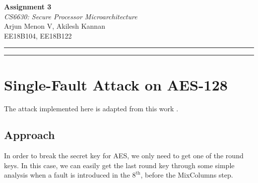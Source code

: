 \documentclass[12pt,a4paper,english]{paper}
\def \courseNumber {CS6630}
\def \courseName {Secure Processor Microarchitecture}
\def \assignmentName {Assignment 3}
\def \myName {Arjun Menon V, Akilesh Kannan}
\def \rollNumber {EE18B104, EE18B122}
\newenvironment{warning}{%
  \def\FrameCommand{%
    \hspace{1pt}%
    {\color{red}\vrule width 2pt}%
    {\color{formalred}\vrule width 4pt}%
    \colorbox{formalred}%
  }%
  \MakeFramed{\advance\hsize-\width\FrameRestore}%
  \noindent\hspace{-4.55pt}%
  \begin{adjustwidth}{7pt}{}%
  \vspace{2pt}\vspace{2pt}%
}
{%
  \vspace{2pt}\end{adjustwidth}\endMakeFramed%
}
\begin{document}
\thispagestyle{empty}
\vspace{-4.5cm}

\hspace*{-\parindent}
\begin{minipage}{0.65\textwidth}
\fontsize{22pt}{10pt}\selectfont\textbf{\assignmentName}\\[1mm]
\Large
\textit{\courseNumber: \courseName}\\[5mm]
\Large \myName \\[1mm]
\normalsize \rollNumber \\
\end{minipage}\hfill%

\hrule \hrule
\medskip

\section{Single-Fault Attack on AES-128}

\begin{warning}
The attack implemented here is adapted from this work \cite{10.1007/978-3-642-21040-2_15}.
\end{warning}

\subsection{Approach}
In order to break the secret key for AES, we only need to get one of the round keys. In this case, we can easily get the last round key through some simple analysis when a fault is introduced in the $8^{\text{th}}$, before the {\selectfont MixColumns} step.
\end{document}
